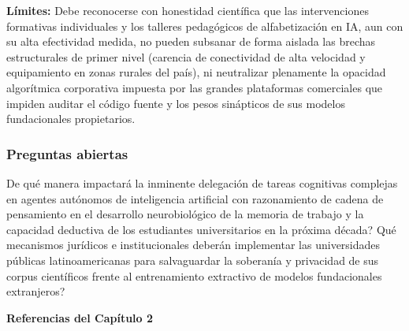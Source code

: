 \textbf{Límites:} Debe reconocerse con honestidad científica que las intervenciones formativas individuales y los talleres pedagógicos de alfabetización en IA, aun con su alta efectividad medida, no pueden subsanar de forma aislada las brechas estructurales de primer nivel (carencia de conectividad de alta velocidad y equipamiento en zonas rurales del país), ni neutralizar plenamente la opacidad algorítmica corporativa impuesta por las grandes plataformas comerciales que impiden auditar el código fuente y los pesos sinápticos de sus modelos fundacionales propietarios.

\subsubsection*{Preguntas abiertas}
\textquestiondown De qué manera impactará la inminente delegación de tareas cognitivas complejas en agentes autónomos de inteligencia artificial con razonamiento de cadena de pensamiento en el desarrollo neurobiológico de la memoria de trabajo y la capacidad deductiva de los estudiantes universitarios en la próxima década? \textquestiondown Qué mecanismos jurídicos e institucionales deberán implementar las universidades públicas latinoamericanas para salvaguardar la soberanía y privacidad de sus corpus científicos frente al entrenamiento extractivo de modelos fundacionales extranjeros?

\newpage

\newpage
{}
\vspace*{0.8cm}
{\Huge \textbf{Referencias del Capítulo 2}}\\[0.8cm]

